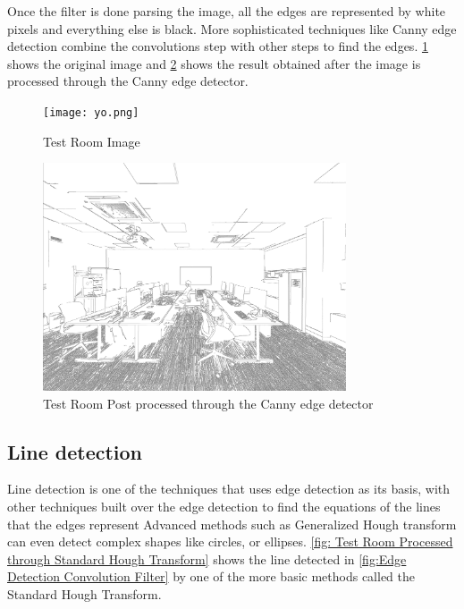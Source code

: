 Once the filter is done parsing the image, all the edges are represented by white pixels and everything else is black. More sophisticated techniques like Canny edge detection combine the convolutions step with other steps to find the edges. \ref{fig: Test Room Image} shows the original image and \ref{fig: Test Room Post processed through the Canny edge detector} shows the result obtained after the image is processed through the Canny edge detector.

\begin{figure}[H]
    \centering
    \texttt{[image: yo.png]}
    \caption{Test Room Image}
    \label{fig: Test Room Image}
\end{figure}

\begin{figure}[H]
    \centering
    \includegraphics[width=0.8\textwidth]{white_edge.png}
    \caption{Test Room Post processed through the Canny edge detector}
    \label{fig: Test Room Post processed through the Canny edge detector}
\end{figure}


\subsection{Line detection}

Line detection is one of the techniques that uses edge detection as its basis, with other techniques built over the edge detection to find the equations of the lines that the edges represent Advanced methods such as Generalized Hough transform can even detect complex shapes like circles, or ellipses. \ref{fig: Test Room Processed through Standard Hough Transform} shows the line detected in \ref{fig:Edge Detection Convolution Filter} by one of the more basic methods called the Standard Hough Transform.

